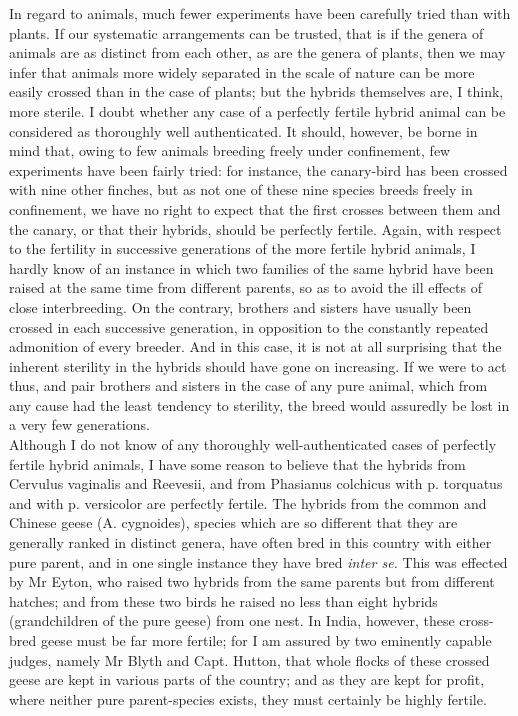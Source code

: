 \indent In regard to animals, much fewer experiments have been carefully tried than with plants. If our systematic arrangements can be trusted, that is if the genera of animals are as distinct from each other, as are the genera of plants, then we may infer that animals more widely separated in the scale of nature can be more easily crossed than in the case of plants; but the hybrids themselves are, I think, more sterile. I doubt whether any case of a perfectly fertile hybrid animal can be considered as thoroughly well authenticated. It should, however, be borne in mind that, owing to few animals breeding freely under confinement, few experiments have been fairly tried: for instance, the canary-bird has been crossed with nine other finches, but as not one of these nine species breeds freely in confinement, we have no right to expect that the first crosses between them and the canary, or that their hybrids, should be perfectly fertile. Again, with respect to the fertility in successive generations of the more fertile hybrid animals, I hardly know of an instance in which two families of the same hybrid have been raised at the same time from different parents, so as to avoid the ill effects of close interbreeding. On the contrary, brothers and sisters have usually been crossed in each successive generation, in opposition to the constantly repeated admonition of every breeder. And in this case, it is not at all surprising that the inherent sterility in the hybrids should have gone on increasing. If we were to act thus, and pair brothers and sisters in the case of any pure animal, which from any cause had the least tendency to sterility, the breed would assuredly be lost in a very few generations.\\
\indent Although I do not know of any thoroughly well-authenticated cases of perfectly fertile hybrid animals, I have some reason to believe that the hybrids from Cervulus vaginalis and Reevesii, and from Phasianus colchicus with p. torquatus and with p. versicolor are perfectly fertile. The hybrids from the common and Chinese geese (A. cygnoides), species which are so different that they are generally ranked in distinct genera, have often bred in this country with either pure parent, and in one single instance they have bred \emph{inter se.} This was effected by Mr Eyton, who raised two hybrids from the same parents but from different hatches; and from these two birds he raised no less than eight hybrids (grandchildren of the pure geese) from one nest. In India, however, these cross-bred geese must be far more fertile; for I am assured by two eminently capable judges, namely Mr Blyth and Capt. Hutton, that whole flocks of these crossed geese are kept in various parts of the country; and as they are kept for profit, where neither pure parent-species exists, they must certainly be highly fertile.\\

